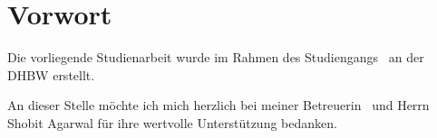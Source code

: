 \chapter*{Vorwort}

Die vorliegende Studienarbeit wurde im Rahmen des Studiengangs \Studiengang\ an der DHBW erstellt.


An dieser Stelle möchte ich mich herzlich bei meiner Betreuerin \BetreuerDHBW\ und Herrn Shobit Agarwal für ihre wertvolle Unterstützung bedanken.
